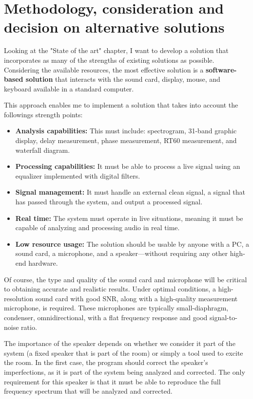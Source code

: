 \chapter{Methodology, consideration and decision on alternative solutions}

Looking at the "State of the art" chapter, I want to develop a solution that incorporates as many of the strengths of existing solutions as possible. Considering the available resources, the most effective solution is a \textbf{software-based solution} that interacts with the sound card, display, mouse, and keyboard available in a standard computer.

This approach enables me to implement a solution that takes into account the followings strength points:

\begin{itemize}
	\item \textbf{Analysis capabilities:} This must include: spectrogram, 31-band graphic display, delay measurement, phase measurement, RT60 measurement, and waterfall diagram.
	
	\item \textbf{Processing capabilities:} It must be able to process a live signal using an equalizer implemented with digital filters.
	
	\item \textbf{Signal management:} It must handle an external clean signal, a signal that has passed through the system, and output a processed signal.
	
	\item \textbf{Real time:} The system must operate in live situations, meaning it must be capable of analyzing and processing audio in real time.
	
	\item \textbf{Low resource usage:} The solution should be usable by anyone with a PC, a sound card, a microphone, and a speaker—without requiring any other high-end hardware.
\end{itemize}

Of course, the type and quality of the sound card and microphone will be critical to obtaining accurate and realistic results. Under optimal conditions, a high-resolution sound card with good SNR, along with a high-quality measurement microphone, is required. These microphones are typically small-diaphragm, condenser, omnidirectional, with a flat frequency response and good signal-to-noise ratio.

The importance of the speaker depends on whether we consider it part of the system (a fixed speaker that is part of the room) or simply a tool used to excite the room. In the first case, the program should correct the speaker's imperfections, as it is part of the system being analyzed and corrected. The only requirement for this speaker is that it must be able to reproduce the full frequency spectrum that will be analyzed and corrected.

